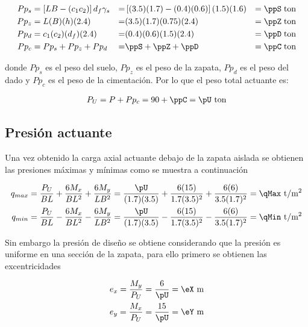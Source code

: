 \documentclass[11pt,a4paper,fleqn]{article}
\begin{document}
\begin{align*}
	Pp_{s}&=\left[LB-(c_1c_2)\right]d_f\gamma_s&=&\left[(\lZ)(\bZ)-(\caZ)(\cbZ)\right](\dfZ)(\gammaS)&=&\;\ppS \text{\;ton}\\
	Pp_{z}&=L(B)(h)(2.4)&=&(\lZ)(\bZ)(\hZ)(2.4)&=&\;\ppZ \text{\;ton}\\
	Pp_{d}&=c_1(c_2)(d_f)(2.4)&=&(\caZ)(\cbZ)(\dfZ)(2.4)&=&\;\ppD \text{\;ton}\\
	Pp_{c}&=Pp_{s}+Pp_{z}+Pp_{d}&=&\ppS+\ppZ+\ppD&=&\;\ppC \text{\;ton}
\end{align*}

donde $Pp_{s}$ es el peso del suelo, $Pp_{z}$ es el peso de la zapata, $Pp_{d}$ es el peso del dado y $Pp_{c}$ es el peso de la cimentación. 
Por lo que el peso total actuante es:

\begin{align*}
	P_{U}=P+Pp_{c}=\pZ+\ppC=\pU \text{ ton}
\end{align*}

\subsection{Presión actuante}
Una vez obtenido la carga axial actuante debajo de la zapata aislada se obtienen las presiones máximas y mínimas como se muestra a continuación


\begin{align*}
	q_{max}=\frac{P_{U}}{BL}+\frac{6M_x}{BL^2}+\frac{6M_y}{LB^2}=\frac{\pU}{(\bZ)(\lZ)}+\frac{6(\mxZ)}{\bZ(\lZ)^2}+\frac{6(\myZ)}{\lZ(\bZ)^2}=\qMax \text{ t/m$^2$}\\
	q_{min}=\frac{P_{U}}{BL}-\frac{6M_x}{BL^2}-\frac{6M_y}{LB^2}=\frac{\pU}{(\bZ)(\lZ)}-\frac{6(\mxZ)}{\bZ(\lZ)^2}-\frac{6(\myZ)}{\lZ(\bZ)^2}=\qMin \text{ t/m$^2$}
\end{align*}

Sin embargo la presión de diseño se obtiene considerando que la presión es uniforme en una sección de la zapata, para ello primero se obtienen las excentricidades


\begin{align*}
	e_x=\frac{M_y}{P_U}=\frac{\myZ}{\pU}=\eX \text{ m}\\
	e_y=\frac{M_x}{P_U}=\frac{\mxZ}{\pU}=\eY \text{ m}
\end{align*}
\end{document}
